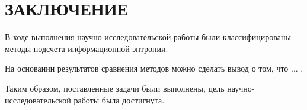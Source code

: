 \chapter*{ЗАКЛЮЧЕНИЕ}

В ходе выполнения научно-исследовательской работы были классифицированы методы подсчета информационной энтропии.

На основании результатов сравнения методов можно сделать вывод о том, что ... .

Таким образом, поставленные задачи были выполнены, цель научно-исследовательской работы была достигнута.